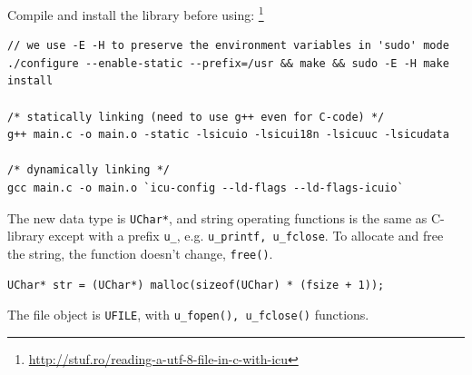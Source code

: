Compile and install the library before using:
\footnote{\url{http://stuf.ro/reading-a-utf-8-file-in-c-with-icu}}
\begin{verbatim}
// we use -E -H to preserve the environment variables in 'sudo' mode
./configure --enable-static --prefix=/usr && make && sudo -E -H make install

/* statically linking (need to use g++ even for C-code) */
g++ main.c -o main.o -static -lsicuio -lsicui18n -lsicuuc -lsicudata

/* dynamically linking */
gcc main.c -o main.o `icu-config --ld-flags --ld-flags-icuio`
\end{verbatim}


The new data type is \verb!UChar*!, and string operating functions is the same
as C-library except with a prefix \verb!u_!, e.g. \verb!u_printf, u_fclose!. To
allocate and free the string, the function doesn't change, \verb!free()!.
\begin{verbatim}
UChar* str = (UChar*) malloc(sizeof(UChar) * (fsize + 1));
\end{verbatim}

The file object is \verb!UFILE!, with \verb!u_fopen(), u_fclose()! functions.

